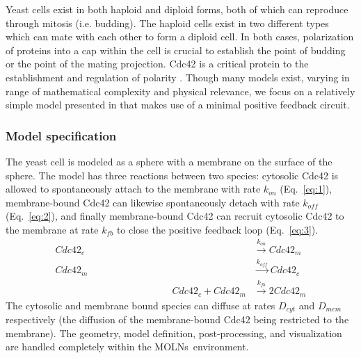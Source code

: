 \documentclass[final,leqno,onefignum,onetabnum]{siamltex1213}
\def\packagename {MOLNs}
\begin{document}
Yeast cells exist in both haploid and diploid forms, both of which can reproduce through mitosis (i.e. budding). The haploid cells exist in two different types which can mate with each other to form a diploid cell. In both cases, polarization of proteins into a cap within the cell is crucial to establish the point of budding or the point of the mating projection.  Cdc42 is a critical protein to the establishment and regulation of polarity \cite{pruyne2000}. Though many models exist, varying in range of mathematical complexity and physical relevance, we focus on a relatively simple model presented in \cite{Altschuler2008, Altschuler2011} that makes use of a minimal positive feedback circuit.

\subsubsection{Model specification}

The yeast cell is modeled as a sphere with a membrane on the surface of the sphere. The model has three reactions between two species: cytosolic Cdc42 is allowed to spontaneously attach to the membrane with rate $k_{on}$ (Eq.~\ref{eq:1}), membrane-bound Cdc42 can likewise spontaneously detach with  rate $k_{off}$ (Eq.~\ref{eq:2}), and finally membrane-bound Cdc42 can recruit cytosolic Cdc42 to the membrane at rate $k_{fb}$ to close the positive feedback loop (Eq.~\ref{eq:3}).
\begin{align}
 Cdc42_c &\xrightarrow{k_{on}} Cdc42_m \label{eq:1} \\
 Cdc42_m &\xrightarrow{k_{off}} Cdc42_c \label{eq:2} \\
 \qquad \qquad \qquad \qquad \qquad \qquad Cdc42_c + Cdc42_m &\xrightarrow{k_{fb}} 2 Cdc42_m \label{eq:3}
\end{align}
The cytosolic and membrane bound species can diffuse at rates $D_{cyt}$ and $D_{mem}$ respectively (the diffusion of the membrane-bound Cdc42 being restricted to the membrane). The geometry, model definition, post-processing, and visualization are handled completely within the \packagename~environment.
\end{document}
